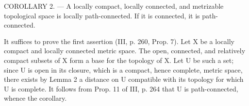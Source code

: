 COROLLARY 2. --- A locally compact, locally connected, and metrizable topological space is locally path-connected. If it is connected, it is path-connected.

It suffices to prove the first assertion (III, p. 260, Prop. 7). Let X be a locally compact and locally connected metric space. The open, connected, and relatively compact subsets of X form a base for the topology of X. Let U be such a set; since U is open in its closure, which is a compact, hence complete, metric space, there exists by Lemma 2 a distance on U compatible with its topology for which U is complete. It follows from Prop. 11 of III, p. 264 that U is path-connected, whence the corollary.

